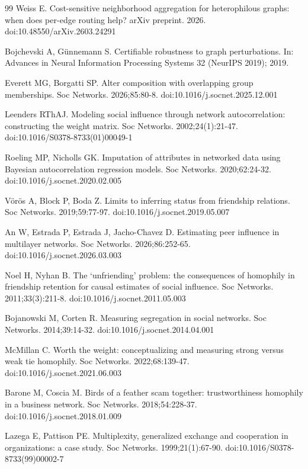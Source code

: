 \documentclass[fonts]{icst}
\theoremstyle{definition}
\begin{document}
\begin{thebibliography}{99}
Weiss E. Cost-sensitive neighborhood aggregation for heterophilous graphs: when does per-edge routing help? arXiv preprint. 2026. doi:10.48550/arXiv.2603.24291

Bojchevski A, G\"unnemann S. Certifiable robustness to graph perturbations. In: Advances in Neural Information Processing Systems 32 (NeurIPS 2019); 2019.

Everett MG, Borgatti SP. Alter composition with overlapping group memberships. Soc Networks. 2026;85:80-8. doi:10.1016/j.socnet.2025.12.001

Leenders RThAJ. Modeling social influence through network autocorrelation: constructing the weight matrix. Soc Networks. 2002;24(1):21-47. doi:10.1016/S0378-8733(01)00049-1

Roeling MP, Nicholls GK. Imputation of attributes in networked data using Bayesian autocorrelation regression models. Soc Networks. 2020;62:24-32. doi:10.1016/j.socnet.2020.02.005

V\"or\"os A, Block P, Boda Z. Limits to inferring status from friendship relations. Soc Networks. 2019;59:77-97. doi:10.1016/j.socnet.2019.05.007

An W, Estrada P, Estrada J, Jacho-Chavez D. Estimating peer influence in multilayer networks. Soc Networks. 2026;86:252-65. doi:10.1016/j.socnet.2026.03.003

Noel H, Nyhan B. The `unfriending' problem: the consequences of homophily in friendship retention for causal estimates of social influence. Soc Networks. 2011;33(3):211-8. doi:10.1016/j.socnet.2011.05.003

Bojanowski M, Corten R. Measuring segregation in social networks. Soc Networks. 2014;39:14-32. doi:10.1016/j.socnet.2014.04.001

McMillan C. Worth the weight: conceptualizing and measuring strong versus weak tie homophily. Soc Networks. 2022;68:139-47. doi:10.1016/j.socnet.2021.06.003

Barone M, Coscia M. Birds of a feather scam together: trustworthiness homophily in a business network. Soc Networks. 2018;54:228-37. doi:10.1016/j.socnet.2018.01.009

Lazega E, Pattison PE. Multiplexity, generalized exchange and cooperation in organizations: a case study. Soc Networks. 1999;21(1):67-90. doi:10.1016/S0378-8733(99)00002-7


\end{thebibliography}
\end{document}
